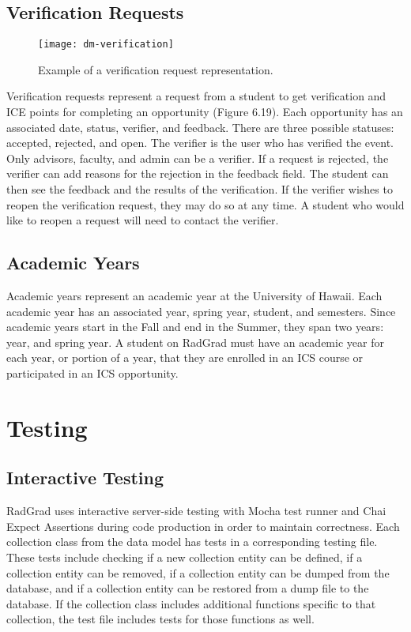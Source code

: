 \subsection{Verification Requests}
\begin{figure}[htbp!]
\centering
\texttt{[image: dm-verification]}
\caption{Example of a verification request representation.}
\end{figure}
Verification requests represent a request from a student to get verification and ICE points for completing an opportunity (Figure 6.19). Each opportunity has an associated date, status, verifier, and feedback. There are three possible statuses: accepted, rejected, and open. The verifier is the user who has verified the event. Only advisors, faculty, and admin can be a verifier. If a request is rejected, the verifier can add reasons for the rejection in the feedback field. The student can then see the feedback and the results of the verification. If the verifier wishes to reopen the verification request, they may do so at any time. A student who would like to reopen a request will need to contact the verifier.  

\subsection{Academic Years}
Academic years represent an academic year at the University of Hawaii. Each academic year has an associated year, spring year, student, and semesters. Since academic years start in the Fall and end in the Summer, they span two years: year, and spring year. A student on RadGrad must have an academic year for each year, or portion of a year, that they are enrolled in an ICS course or participated in an ICS opportunity.

\section{Testing}
\subsection{Interactive Testing}
RadGrad uses interactive server-side testing with Mocha test runner and Chai Expect Assertions during code production in order to maintain correctness. Each collection class from the data model has tests in a corresponding testing file. These tests include checking if a new collection entity can be defined, if a collection entity can be removed, if a collection entity can be dumped from the database, and if a collection entity can be restored from a dump file to the database. If the collection class includes additional functions specific to that collection, the test file includes tests for those functions as well.

